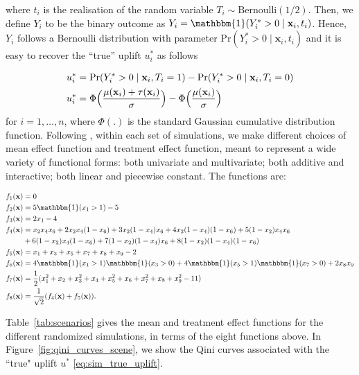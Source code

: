\documentclass{article}
\def\x{\mathbf x}
\begin{document}
where $t_i$ is the realisation of the random variable $T_i \sim \mathrm{Bernoulli}(1/2)$. Then, we define $Y_i$ to be the binary outcome as $
    Y_i = \mathbbm{1}(Y_i^* > 0 \mid \x_i, t_i)$.
Hence, $Y_i$ follows a Bernoulli distribution with parameter $\mathrm{Pr}(Y_i^* > 0 \mid \x_i, t_i)$ and it is easy to recover the ``true'' uplift $u_i^*$ as follows

\begin{align}
    u_i^* &= \mathrm{Pr}(Y_i^* > 0 \mid \x_i, T_i = 1) - \mathrm{Pr}(Y_i^* > 0 \mid \x_i, T_i = 0) \nonumber \\
    u_i^* &= \Phi \Bigl( \frac{\mu(\x_i) + \tau(\x_i)}{\sigma} \Bigr) - \Phi \Big( \frac{\mu(\x_i)}{\sigma} \Big) \label{eq:sim_true_uplift}
\end{align}
for $i=1,\ldots,n$, where $\Phi(.)$ is the standard Gaussian cumulative distribution function. Following \cite{powers2018some},  within each set of simulations, we make different choices of mean effect function and treatment effect function, meant to represent a wide variety of functional forms: both univariate and multivariate; both additive and interactive; both linear and piecewise constant. The functions are:

\begin{align*}
    f_1(\x) &= 0 \\
    f_2(\x) &= 5 \mathbbm{1}(x_1 > 1) - 5\\
    f_3(\x) &= 2 x_1 - 4 \\
    f_4(\x) &= x_2 x_4 x_6 + 2 x_2 x_4 (1-x_6) +3x_2(1-x_4)x_6 + 4x_2(1-x_4)(1-x_6) + 5(1-x_2)x_4x_6 \\
            &+ 6(1-x_2)x_4(1-x_6) + 7 (1-x_2)(1-x_4)x_6 + 8(1-x_2)(1-x_4)(1-x_6)\\
    f_5(\x) &= x_1 + x_3 + x_5 + x_7 + x_8 + x_9 - 2\\
    f_6(\x) &= 4 \mathbbm{1}(x_1 > 1)\mathbbm{1}(x_3 > 0) + 4\mathbbm{1}(x_5 > 1)\mathbbm{1}(x_7 > 0) + 2x_8x_9\\
    f_7(\x) &= \frac{1}{2} (x_1^2 + x_2 + x_3^2 + x_4 + x_5^2 + x_6 + x_7^2 + x_8 + x_9^2 - 11)\\
    f_8(\x) &= \frac{1}{\sqrt{2}} (f_4(\x) + f_5(\x)).
\end{align*}


Table~\ref{tab:scenarios} gives the mean and treatment effect functions for the different randomized simulations, in terms of the eight functions above. In Figure~\ref{fig:qini_curves_scene}, we show the Qini curves associated with the ``true" uplift $u^*$ \eqref{eq:sim_true_uplift}. 
\end{document}
